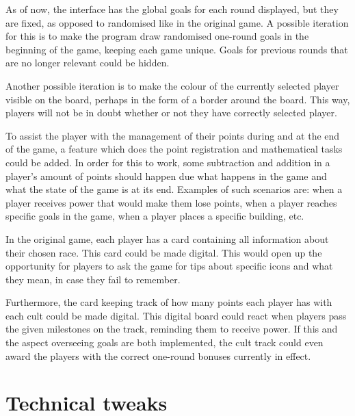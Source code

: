 As of now, the interface has the global goals for each round displayed, but they are fixed, as opposed to randomised like in the original game. A possible iteration for this is to make the program draw randomised one-round goals in the beginning of the game, keeping each game unique. Goals for previous rounds that are no longer relevant could be hidden.

Another possible iteration is to make the colour of the currently selected player visible on the board, perhaps in the form of a border around the board. This way, players will not be in doubt whether or not they have correctly selected player.

To assist the player with the management of their points during and at the end of the game, a feature which does the point registration and mathematical tasks could be added. In order for this to work, some subtraction and addition in a player’s amount of points should happen due what happens in the game and what the state of the game is at its end. Examples of such scenarios are: when a player receives power that would make them lose points, when a player reaches specific goals in the game, when a player places a specific building, etc. 

In the original game, each player has a card containing all information about their chosen race. This card could be made digital. This would open up the opportunity for players to ask the game for tips about specific icons and what they mean, in case they fail to remember.

Furthermore, the card keeping track of how many points each player has with each cult could be made digital. This digital board could react when players pass the given milestones on the track, reminding them to receive power. If this and the aspect overseeing goals are both implemented, the cult track could even award the players with the correct one-round bonuses currently in effect.  

\section{Technical tweaks}